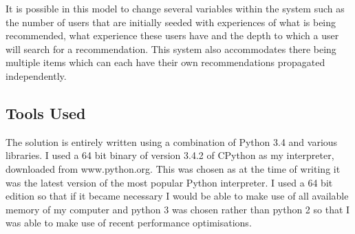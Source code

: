 \documentclass[12pt,a4paper]{article}
\begin{document}
It is possible in this model to change several variables within the system such as the number of users that are initially seeded with experiences of what is being recommended, what experience these users have and the depth to which a user will search for a recommendation. This system also accommodates there being multiple items which can each have their own recommendations propagated independently.




\subsection{Tools Used}

The solution is entirely written using a combination of Python 3.4 and various libraries. I used a 64 bit binary of version 3.4.2 of CPython as my interpreter, downloaded from www.python.org. This was chosen as at the time of writing it was the latest version of the most popular Python interpreter. I used a 64 bit edition so that if it became necessary I would be able to make use of all available memory of my computer and python 3 was chosen rather than python 2 so that I was able to make use of recent performance optimisations.
\end{document}
